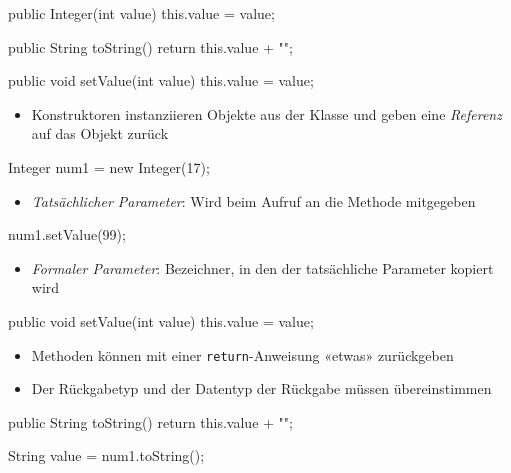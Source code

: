 \documentclass[a4paper,10pt, dvipsnames]{report}
\begin{document}
\begin{javacodebox}
public Integer(int value) {
    this.value = value;
}

public String toString() {
    return this.value + "";
}

public void setValue(int value) {
    this.value = value;
}
\end{javacodebox}

\begin{itemize}
    \item Konstruktoren instanziieren Objekte aus der Klasse und geben eine \textit{Referenz} auf das Objekt zurück
\end{itemize}

\begin{javacodebox}
Integer num1 = new Integer(17);
\end{javacodebox}

\begin{itemize}
    \item \textit{Tatsächlicher Parameter}: Wird beim Aufruf an die Methode mitgegeben
\end{itemize}

\begin{javacodebox}
num1.setValue(99);
\end{javacodebox}

\begin{itemize}
    \item \textit{Formaler Parameter}: Bezeichner, in den der tatsächliche Parameter kopiert wird
\end{itemize}

\begin{javacodebox}
public void setValue(int value) {
    this.value = value;
}
\end{javacodebox}

\begin{itemize}
    \item Methoden können mit einer \texttt{return}-Anweisung «etwas» zurückgeben
    \item Der Rückgabetyp und der Datentyp der Rückgabe müssen übereinstimmen
\end{itemize}

\begin{javacodebox}
public String toString() {
    return this.value + "";
}
\end{javacodebox}

\begin{javacodebox}
String value = num1.toString();
\end{javacodebox}
\end{document}
